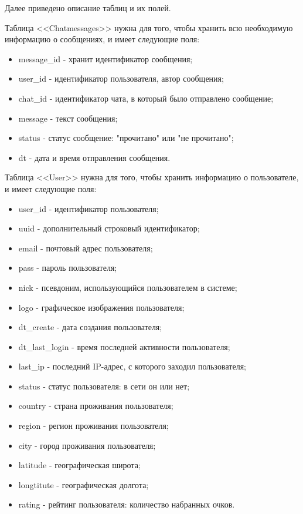 Далее приведено описание таблиц и их полей. \par 
Таблица <<Chatmessages>> нужна для того, чтобы хранить всю необходимую информацию о сообщениях, и 
имеет следующие поля:
\begin{itemize}
    \item message\_id - хранит идентификатор сообщения;
    \item user\_id - идентификатор пользователя, автор сообщения;
    \item chat\_id - идентификатор чата, в который было отправлено сообщение;
    \item message - текст сообщения;
    \item status - статус сообщение: "прочитано" или "не прочитано";
    \item dt - дата и время отправления сообщения.
\end{itemize}

\vspace{1em}

Таблица <<User>> нужна для того, чтобы хранить информацию о пользователе, и имеет следующие поля:
\begin{itemize}
    \item user\_id - идентификатор пользователя;
    \item uuid - дополнительный строковый идентификатор;
    \item email - почтовый адрес пользователя;
    \item pass - пароль пользователя;
    \item nick - псевдоним, использующийся пользователем в системе;
    \item logo - графическое изображения пользователя;
    \item dt\_create - дата создания пользователя;
    \item dt\_last\_login - время последней активности пользователя;
    \item last\_ip - последний IP-адрес, с которого заходил пользователя;
    \item status - статус пользователя: в сети он или нет;
    \item country - страна проживания пользователя;
    \item region - регион проживания пользователя;
    \item city - город проживания пользователя;
    \item latitude - географическая широта;
    \item longtitute - географическая долгота;
    \item rating - рейтинг пользователя: количество набранных очков.
\end{itemize}

